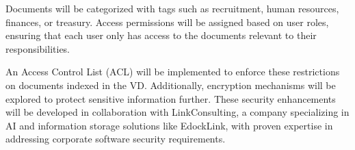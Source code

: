 Documents will be categorized with tags such as recruitment, human resources, finances, or treasury. Access permissions will be assigned based on user roles, ensuring that each user only has access to the documents relevant to their responsibilities.

An Access Control List (ACL) will be implemented to enforce these restrictions on documents indexed in the \ac{VD}. Additionally, encryption mechanisms will be explored to protect sensitive information further. These security enhancements will be developed in collaboration with LinkConsulting, a company specializing in AI and information storage solutions like EdockLink, with proven expertise in addressing corporate software security requirements.



